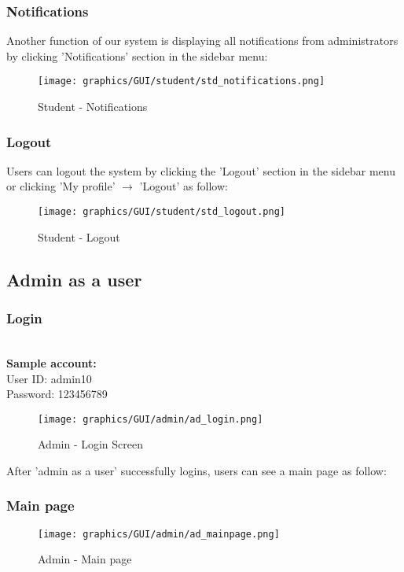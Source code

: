             \subsubsection{Notifications}
            \noindent Another function of our system is displaying all notifications from administrators by clicking 'Notifications' section in the sidebar menu:
                \begin{figure}[H]
                    \centering
                    \texttt{[image: graphics/GUI/student/std\_notifications.png]}
                    \caption{Student - Notifications}
                \label{fig:std_noti}
                \end{figure}
          \subsubsection{Logout}      
            \noindent Users can logout the system by clicking the 'Logout' section in the sidebar menu or clicking 'My profile' $\rightarrow$ 'Logout' as follow:
                \begin{figure}[H]
                    \centering
                    \texttt{[image: graphics/GUI/student/std\_logout.png]}
                    \caption{Student - Logout}
                \label{fig:std_logout}
                \end{figure}
        \newpage

\subsection{Admin as a user}
    \subsubsection{Login}
    \\ \noindent \textbf{Sample account:} 
    \\ User ID: admin10
    \\ Password: 123456789
    
        \begin{figure}[H]
            \centering
            \texttt{[image: graphics/GUI/admin/ad\_login.png]}
            \caption{Admin - Login Screen}
        \label{fig:ad_loginscreen}
        \end{figure}
\noindent After 'admin as a user' successfully logins, users can see a main page as follow:
    \subsubsection{Main page}
        \begin{figure}[H]
            \centering
            \texttt{[image: graphics/GUI/admin/ad\_mainpage.png]}
            \caption{Admin - Main page}
        \label{fig:ad_mainpage}
        \end{figure}
    
